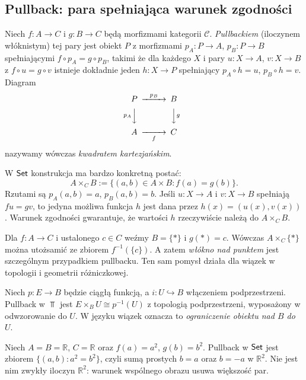 \subsection{Pullback: para spełniająca warunek zgodności}

\begin{definicja}\label{def:pullback}
Niech $f:A\to C$ i $g:B\to C$ będą morfizmami kategorii $\mathcal C$. \emph{Pullbackiem} (iloczynem włóknistym) tej pary jest obiekt $P$ z morfizmami $p_A:P\to A$, $p_B:P\to B$ spełniającymi $f\circ p_A=g\circ p_B$, takimi że dla każdego $X$ i pary $u:X\to A$, $v:X\to B$ z $f\circ u=g\circ v$ istnieje dokładnie jeden $h:X\to P$ spełniający $p_A\circ h=u$, $p_B\circ h=v$. Diagram
\[
\begin{CD}
P @>{p_B}>> B\\
@V{p_A}VV @VV{g}V\\
A @>>{f}> C
\end{CD}
\]
nazywamy wówczas \emph{kwadratem kartezjańskim}.
\end{definicja}

\begin{przyklad}\label{przyklad:włokna}
W $\mathsf{Set}$ konstrukcja ma bardzo konkretną postać:
\[
A\times_C B:=\{(a,b)\in A\times B:f(a)=g(b)\}.
\]
Rzutami są $p_A(a,b)=a$, $p_B(a,b)=b$. Jeśli $u:X\to A$ i $v:X\to B$ spełniają $fu=gv$, to jedyna możliwa funkcja $h$ jest dana przez $h(x)=(u(x),v(x))$. Warunek zgodności gwarantuje, że wartości $h$ rzeczywiście należą do $A\times_C B$.
\end{przyklad}

\begin{przyklad}
Dla $f:A\to C$ i ustalonego $c\in C$ weźmy $B=\{*\}$ i $g(*)=c$. Wówczas $A\times_C\{*\}$ można utożsamić ze zbiorem $f^{-1}(\{c\})$. A zatem \emph{włókno nad punktem} jest szczególnym przypadkiem pullbacku. Ten sam pomysł działa dla wiązek w topologii i geometrii różniczkowej.
\end{przyklad}

\begin{przyklad}
Niech $p:E\to B$ będzie ciągłą funkcją, a $i:U\hookrightarrow B$ włączeniem podprzestrzeni. Pullback w $\Top$ jest $E\times_B U\cong p^{-1}(U)$ z topologią podprzestrzeni, wyposażony w odwzorowanie do $U$. W języku wiązek oznacza to \emph{ograniczenie obiektu nad $B$ do $U$}.
\end{przyklad}

\begin{przyklad}
Niech $A=B=\mathbb R$, $C=\mathbb R$ oraz $f(a)=a^2$, $g(b)=b^2$. Pullback w $\mathsf{Set}$ jest zbiorem $\{(a,b):a^2=b^2\}$, czyli sumą prostych $b=a$ oraz $b=-a$ w $\mathbb R^2$. Nie jest nim zwykły iloczyn $\mathbb R^2$: warunek wspólnego obrazu usuwa większość par.
\end{przyklad}


